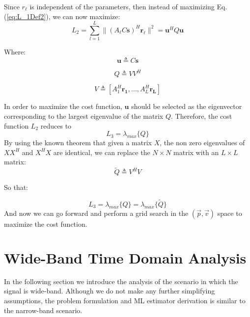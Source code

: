 \documentclass[10pt,a4paper]{report}
\begin{document}
Since $r_\ell$ is independent of the parameters, then instead of maximizing Eq. (\ref{eq:L_1Def2}), we can now maximize:
\begin{equation}
\label{eq:L_2Def}
L_2=\sum_{l=1}^{L}\|(A_\ell C \mathbf{s})^H \mathbf{r_\ell}\|^2=\mathbf{u}^HQ\mathbf{u}
\end{equation}

Where:
\begin{equation}
\mathbf{u} \triangleq C \mathbf{s}
\end{equation}

\begin{equation}
Q \triangleq V V^H
\end{equation}

\begin{equation}
V \triangleq [A_1^H \mathbf{r_1},\dots,A_L^H \mathbf{r_L}]                                                        
\end{equation}

In order to maximize the cost function, $\mathbf{u}$ should be selected as the eigenvector corresponding to the largest eigenvalue of the matrix $Q$.
Therefore, the cost function $L_2$ reduces to
\begin{equation}
L_3= \lambda_{max} \{Q\}
\end{equation}
By using the known theorem that given a matrix $X$, the non zero eigenvalues of $XX^H$ and $X^H X$ are identical, we can replace the $N \times N$ matrix with an $L \times L$ matrix: 
\begin{equation}
\tilde{Q} \triangleq  V^H V 
\end{equation}

So that:

\begin{equation}
L_3= \lambda_{max} \{Q\} = \lambda_{max} \{\tilde{Q}\}
\end{equation}
And now we can go forward and perform a grid search in the $(\vec{p},\vec{v})$ space to maximize the cost function.

\section{Wide-Band Time Domain Analysis}
In the following section we introduce the analysis of the scenario in which the signal is wide-band. 
Although we do not make any further simplifying assumptions, the problem formulation and ML estimator derivation is similar to the narrow-band scenario.\\
\end{document}
